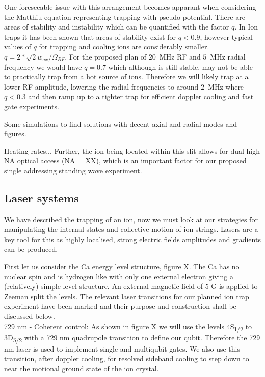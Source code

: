\documentclass[12pt]{iopart}
\begin{document}
One foreseeable issue with this arrangement becomes apparant when
considering the Matthiu equation representing trapping with
pseudo-potential. There are areas of stability and instability which
can be quantified with the factor $q$. In Ion traps it has been shown
that areas of stability exist for $q<0.9$, however typical values of
$q$ for trapping and cooling ions are considerably smaller.
$q = 2*\sqrt{2}w_{ax}/\Omega_{RF}$.
For the proposed plan of $20$~MHz RF and $5$~MHz radial frequency we
would have $q = 0.7$ which although is still stable, may not be able
to practically trap from a hot source of ions. Therefore we will
likely trap at a lower RF amplitude, lowering the radial frequencies
to around $2$~MHz where $q<0.3$ and then ramp up to a tighter trap for
efficient doppler cooling and fast gate experiments.

Some simulations to find solutions with decent axial and radial modes and figures.

Heating rates... Further, the ion being located within this
slit allows for dual high NA optical access (NA = XX), which is an
important factor for our proposed single addressing standing wave
experiment.

\subsection{Laser systems}

We have described the trapping of an ion, now we must look at our
strategies for manipulating the internal states and collective motion
of ion strings. Lasers are a key tool for this as highly localised,
strong electric fields amplitudes and gradients can be produced.

First let us consider the Ca\superscript{+} energy
level structure, figure X. The Ca\superscript{+} has
no nuclear spin and is hydrogen like with only one external electron
giving a (relatively) simple level structure. An external magnetic
field of $5$ G is applied to Zeeman split the levels. The relevant
laser transitions for our planned ion trap experiment have been marked
and their purpose and construction shall be discussed below.\\

729 nm - Coherent control: As shown in figure X we will use the levels
4S\textsubscript{1/2} to 3D\textsubscript{5/2} with a 729 nm
quadrupole transition to define our qubit. Therefore the 729 nm laser
is used to implement single and multiqubit gates. We also use this
transition, after doppler cooling, for resolved sideband cooling to
step down to near the motional ground state of the ion crystal.
\end{document}
